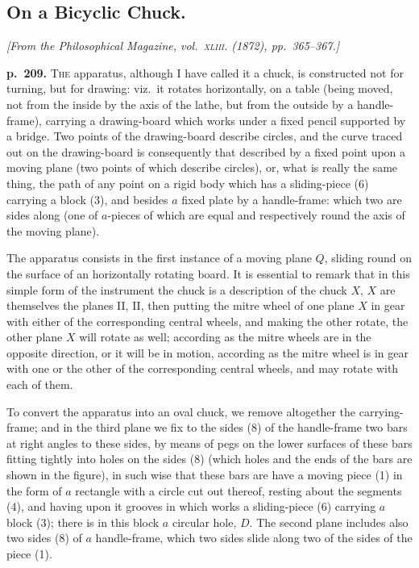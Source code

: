 \documentclass[11pt,a4paper]{book}
\begin{document}
\subsection{On a Bicyclic Chuck.}

\begin{center}
\textit{[From the Philosophical Magazine, vol.\ \textsc{xliii}. (1872), pp.\ 365--367.]}
\end{center}

\noindent
\textbf{p.~209.}  \textsc{The} apparatus, although I have called it a chuck, is constructed not for turning, but for drawing: viz.\ it rotates horizontally, on a table (being moved, not from the inside by the axis of the lathe, but from the outside by a handle-frame), carrying a drawing-board which works under a fixed pencil supported by a bridge.  Two points of the drawing-board describe circles, and the curve traced out on the drawing-board is consequently that described by a fixed point upon a moving plane (two points of which describe circles), or, what is really the same thing, the path of any point on a rigid body which has a sliding-piece (6) carrying a block (3), and besides $a$ fixed plate by a handle-frame: which two are sides along (one of $a$-pieces of which are equal and respectively round the axis of the moving plane).

The apparatus consists in the first instance of a moving plane $Q$, sliding round on the surface of an horizontally rotating board.  It is essential to remark that in this simple form of the instrument the chuck is a description of the chuck $X$, $X$ are themselves the planes II, II, then putting the mitre wheel of one plane $X$ in gear with either of the corresponding central wheels, and making the other rotate, the other plane $X$ will rotate as well; according as the mitre wheels are in the opposite direction, or it will be in motion, according as the mitre wheel is in gear with one or the other of the corresponding central wheels, and may rotate with each of them.

To convert the apparatus into an oval chuck, we remove altogether the carrying-frame; and in the third plane we fix to the sides (8) of the handle-frame two bars at right angles to these sides, by means of pegs on the lower surfaces of these bars fitting tightly into holes on the sides (8) (which holes and the ends of the bars are shown in the figure), in such wise that these bars are have a moving piece (1) in the form of $a$ rectangle with a circle cut out thereof, resting about the segments (4), and having upon it grooves in which works a sliding-piece (6) carrying $a$ block (3); there is in this block $a$ circular hole, $D$.  The second plane includes also two sides (8) of $a$ handle-frame, which two sides slide along two of the sides of the piece (1).
\end{document}
